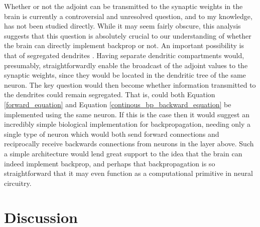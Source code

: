 Whether or not the adjoint can be transmitted to the synaptic weights in the brain is currently a controversial and unresolved question, and to my knowledge, has not been studied directly. While it may seem fairly obscure, this analysis suggests that this question is absolutely crucial to our understanding of whether the brain can directly implement backprop or not. An important possibility is that of segregated dendrites \citep{sacramento2018dendritic}. Having separate dendritic compartments would, presumably, straightforwardly enable the broadcast of the adjoint values to the synaptic weights, since they would be located in the dendritic tree of the same neuron. The key question would then become whether information transmitted to the dendrites could remain segregated. That is, could both Equation \ref{forward_equation} and Equation \ref{continous_bp_backward_equation} be implemented using the same neuron. If this is the case then it would suggest an incredibly simple biological implementation for backpropagation, needing only a single type of neuron which would both send forward connections and reciprocally receive backwards connections from neurons in the layer above. Such a simple architecture would lend great support to the idea that the brain can indeed implement backprop, and perhaps that backpropagation is so straightforward that it may even function as a computational primitive in neural circuitry.

\section{Discussion}

